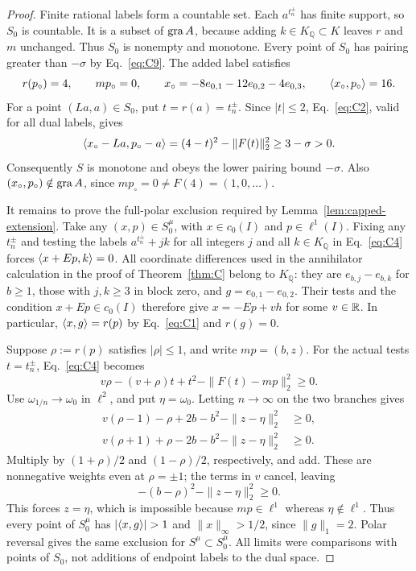 \begin{proof}
Finite rational labels form a countable set. Each $a^{t_n^\pm}$ has
finite support, so $S_0$ is countable. It is a subset of $\operatorname{gra} A$,
because adding $k\in K_{\mathbb Q}\subset K$ leaves $r$ and $m$
unchanged. Thus $S_0$ is nonempty and monotone. Every point of $S_0$ has
pairing greater than $-\sigma$ by Eq.~\eqref{eq:C9}.
The added label satisfies
\[
r(p_\circ)=4,\qquad mp_\circ=0,\qquad
x_\circ=-8e_{0,1}-12e_{0,2}-4e_{0,3},\qquad
\langle x_\circ,p_\circ\rangle=16.
\]
For a point $(La,a)\in S_0$, put $t=r(a)=t_n^\pm$. Since $|t|\le2$,
Eq.~\eqref{eq:C2}, valid for all dual labels, gives
\[
\langle x_\circ-La,p_\circ-a\rangle
=(4-t)^2-\|F(t)\|_2^2\ge3-\sigma>0.
\]
Consequently $S$ is monotone and obeys the lower pairing bound
$-\sigma$. Also $(x_\circ,p_\circ)\notin\operatorname{gra} A$, since
$mp_\circ=0\ne F(4)=(1,0,\ldots)$.

It remains to prove the full-polar exclusion required by
Lemma~\ref{lem:capped-extension}. Take any
$(x,p)\in S_0^\mu$, with $x\in c_0(I)$ and $p\in\ell^1(I)$.
Fixing any $t_n^\pm$ and testing the labels
$a^{t_n^\pm}+j k$ for all integers $j$ and all $k\in K_{\mathbb Q}$
in Eq.~\eqref{eq:C4} forces $\langle x+Ep,k\rangle=0$.
All coordinate differences used in the annihilator calculation in the
proof of Theorem~\ref{thm:C} belong to $K_{\mathbb Q}$: they are
$e_{b,j}-e_{b,k}$ for $b\ge1$, those with $j,k\ge3$ in block zero,
and $g=e_{0,1}-e_{0,2}$. Their tests and the condition $x+Ep\in c_0(I)$
therefore give $x=-Ep+v h$ for some $v\in\mathbb R$.
In particular, $\langle x,g\rangle=r(p)$ by Eq.~\eqref{eq:C1} and $r(g)=0$.

Suppose $\rho:=r(p)$ satisfies $|\rho|\le1$, and write $mp=(b,z)$.
For the actual tests $t=t_n^\pm$, Eq.~\eqref{eq:C4} becomes
\[
v\rho-(v+\rho)t+t^2-\|F(t)-mp\|_2^2\ge0.
\]
Use $\omega_{1/n}\to\omega_0$ in $\ell^2$, and put
$\eta=\omega_0$. Letting $n\to\infty$ on the two branches gives
\begin{align*}
v(\rho-1)-\rho+2b-b^2-\|z-\eta\|_2^2&\ge0,\\
v(\rho+1)+\rho-2b-b^2-\|z-\eta\|_2^2&\ge0.
\end{align*}
Multiply by $(1+\rho)/2$ and $(1-\rho)/2$, respectively, and add.
These are nonnegative weights even at $\rho=\pm1$; the terms in $v$
cancel, leaving
\[
-(b-\rho)^2-\|z-\eta\|_2^2\ge0.
\]
This forces $z=\eta$, which is impossible because $mp\in\ell^1$
whereas $\eta\notin\ell^1$. Thus every point of $S_0^\mu$ has
$|\pair{x}{g}|>1$ and $\|x\|_\infty>1/2$, since $\|g\|_1=2$.
Polar reversal gives the same exclusion for $S^\mu\subset S_0^\mu$.
All limits were comparisons with points of $S_0$, not additions of
endpoint labels to the dual space.


\end{proof}
